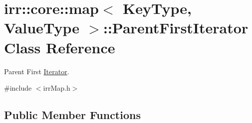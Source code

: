 \hypertarget{classirr_1_1core_1_1map_1_1ParentFirstIterator}{}\section{irr\+:\+:core\+:\+:map$<$ Key\+Type, Value\+Type $>$\+:\+:Parent\+First\+Iterator Class Reference}
\label{classirr_1_1core_1_1map_1_1ParentFirstIterator}


Parent First \hyperlink{classirr_1_1core_1_1map_1_1Iterator}{Iterator}.  




{\ttfamily \#include $<$irr\+Map.\+h$>$}

\subsection*{Public Member Functions}
